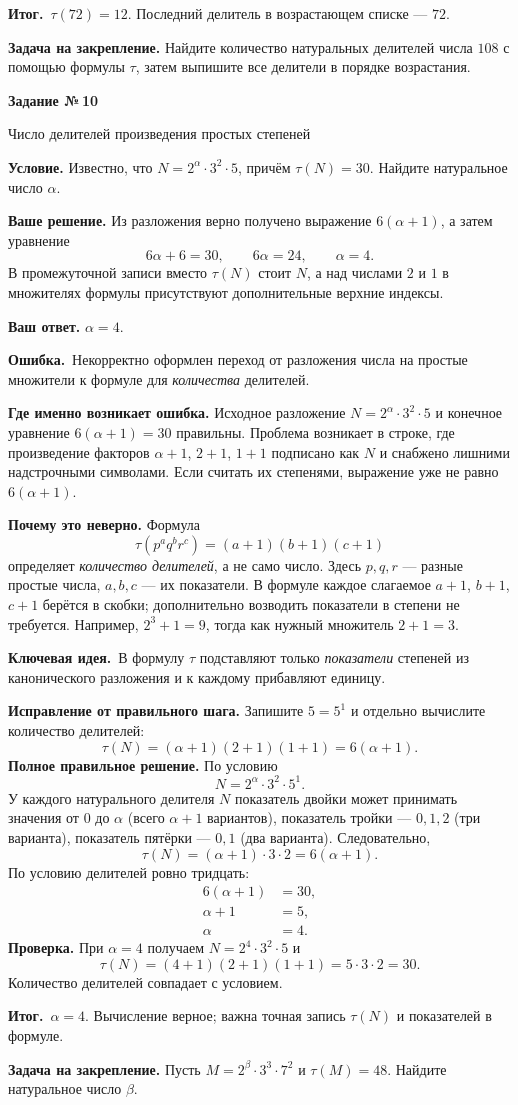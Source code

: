 \documentclass[a4paper,12pt]{article}
\newcommand{\keyidea}{\textcolor{accent}{\textbf{Ключевая идея.}}\ }
\newcommand{\errorhead}{\textcolor{red!65!black}{\textbf{Ошибка.}}\ }
\newcommand{\result}{\textcolor{deep}{\textbf{Итог.}}\ }
\newcommand{\tasktitle}[2]{%
  \clearpage\phantomsection\label{task:#1}%
  {\Large\bfseries\color{deep}Задание №\,#1}\par\vspace{2mm}
  {\color{muted}\large #2}\par\vspace{5mm}
}
\begin{document}
\result $\tau(72)=12$. Последний делитель в возрастающем списке --- $72$.

\textbf{Задача на закрепление.} Найдите количество натуральных делителей числа $108$ с помощью формулы $\tau$, затем выпишите все делители в порядке возрастания.

\tasktitle{10}{Число делителей произведения простых степеней}
\textbf{Условие.} Известно, что $N=2^{\alpha}\cdot3^2\cdot5$, причём $\tau(N)=30$. Найдите натуральное число $\alpha$.

\textbf{Ваше решение.} Из разложения верно получено выражение $6(\alpha+1)$, а затем уравнение
\[
6\alpha+6=30,\qquad 6\alpha=24,\qquad\alpha=4.
\]
В промежуточной записи вместо $\tau(N)$ стоит $N$, а над числами $2$ и $1$ в множителях формулы присутствуют дополнительные верхние индексы.

\textbf{Ваш ответ.} $\alpha=4$.

\errorhead Некорректно оформлен переход от разложения числа на простые множители к формуле для \emph{количества} делителей.

\textbf{Где именно возникает ошибка.} Исходное разложение $N=2^{\alpha}\cdot3^2\cdot5$ и конечное уравнение $6(\alpha+1)=30$ правильны. Проблема возникает в строке, где произведение факторов $\alpha+1$, $2+1$, $1+1$ подписано как $N$ и снабжено лишними надстрочными символами. Если считать их степенями, выражение уже не равно $6(\alpha+1)$.

\textbf{Почему это неверно.} Формула
\[
\tau(p^aq^br^c)=(a+1)(b+1)(c+1)
\]
определяет \emph{количество делителей}, а не само число. Здесь $p,q,r$ --- разные простые числа, $a,b,c$ --- их показатели. В формуле каждое слагаемое $a+1$, $b+1$, $c+1$ берётся в скобки; дополнительно возводить показатели в степени не требуется. Например, $2^3+1=9$, тогда как нужный множитель $2+1=3$.

\newpage\keyidea В формулу $\tau$ подставляют только \emph{показатели} степеней из канонического разложения и к каждому прибавляют единицу.

\textbf{Исправление от правильного шага.} Запишите $5=5^1$ и отдельно вычислите количество делителей:
\[
\tau(N)=(\alpha+1)(2+1)(1+1)=6(\alpha+1).
\]
\textbf{Полное правильное решение.} По условию
\[
N=2^\alpha\cdot3^2\cdot5^1.
\]
У каждого натурального делителя $N$ показатель двойки может принимать значения от $0$ до $\alpha$ (всего $\alpha+1$ вариантов), показатель тройки --- $0,1,2$ (три варианта), показатель пятёрки --- $0,1$ (два варианта). Следовательно,
\[
\tau(N)=(\alpha+1)\cdot3\cdot2=6(\alpha+1).
\]
По условию делителей ровно тридцать:
\begin{align*}
6(\alpha+1)&=30,\\
\alpha+1&=5,\\
\boxed{\alpha}&=4.
\end{align*}
\textbf{Проверка.} При $\alpha=4$ получаем $N=2^4\cdot3^2\cdot5$ и
\[
\tau(N)=(4+1)(2+1)(1+1)=5\cdot3\cdot2=30.
\]
Количество делителей совпадает с условием.

\result $\alpha=4$. Вычисление верное; важна точная запись $\tau(N)$ и показателей в формуле.

\textbf{Задача на закрепление.} Пусть $M=2^{\beta}\cdot3^3\cdot7^2$ и $\tau(M)=48$. Найдите натуральное число $\beta$.
\end{document}
